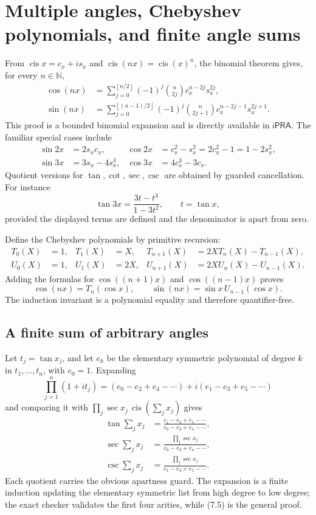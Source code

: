 \documentclass[11pt]{article}
\theoremstyle{definition}
\newcommand{\N}{\mathbb N}
\newcommand{\iPRA}{\mathsf{iPRA}}
\newcommand{\cis}{\operatorname{cis}}
\newcommand{\floor}[1]{\left\lfloor#1\right\rfloor}
\begin{document}
\section{Multiple angles, Chebyshev polynomials, and finite angle sums}
\label{sec:multiple}

From \(\cis x=c_x+is_x\) and \(\cis(nx)=\cis(x)^n\), the binomial theorem gives,
for every \(n\in\N\),
\begin{align}
 \cos(nx)
 &=\sum_{j=0}^{\floor{n/2}}(-1)^j\binom{n}{2j}
 c_x^{n-2j}s_x^{2j},\tag{7.1}\\
 \sin(nx)
 &=\sum_{j=0}^{\floor{(n-1)/2}}(-1)^j\binom{n}{2j+1}
 c_x^{n-2j-1}s_x^{2j+1}.\tag{7.2}
\end{align}
This proof is a bounded binomial expansion and is directly available in
\(\iPRA\).  The familiar special cases include
\begin{align*}
 \sin2x&=2s_xc_x,&
 \cos2x&=c_x^2-s_x^2=2c_x^2-1=1-2s_x^2,\\
 \sin3x&=3s_x-4s_x^3,&
 \cos3x&=4c_x^3-3c_x.
\end{align*}
Quotient versions for \(\tan,\cot,\sec,\csc\) are obtained by guarded
cancellation.  For instance
\[
 \tan3x=\frac{3t-t^3}{1-3t^2},\qquad t=\tan x,
 \tag{7.3}
\]
provided the displayed terms are defined and the denominator is apart from
zero.

Define the Chebyshev polynomials by primitive recursion:
\begin{align*}
 T_0(X)&=1,&T_1(X)&=X,&T_{n+1}(X)&=2XT_n(X)-T_{n-1}(X),\\
 U_0(X)&=1,&U_1(X)&=2X,&U_{n+1}(X)&=2XU_n(X)-U_{n-1}(X).
\end{align*}
Adding the formulas for \(\cos((n+1)x)\) and \(\cos((n-1)x)\) proves
\[
 \cos(nx)=T_n(\cos x),\qquad
 \sin(nx)=\sin x\,U_{n-1}(\cos x).
 \tag{7.4}
\]
The induction invariant is a polynomial equality and therefore quantifier-free.

\subsection{A finite sum of arbitrary angles}

Let \(t_j=\tan x_j\), and let \(e_k\) be the elementary symmetric polynomial
of degree \(k\) in \(t_1,\ldots,t_n\), with \(e_0=1\).  Expanding
\[
 \prod_{j=1}^n(1+it_j)
 =(e_0-e_2+e_4-\cdots)+i(e_1-e_3+e_5-\cdots)
 \tag{7.5}
\]
and comparing it with
\(\prod_j\sec x_j\,\cis(\sum_jx_j)\) gives
\begin{align}
 \tan\sum_jx_j&=
 \frac{e_1-e_3+e_5-\cdots}{e_0-e_2+e_4-\cdots},\tag{7.6}\\
 \sec\sum_jx_j&=
 \frac{\prod_j\sec x_j}{e_0-e_2+e_4-\cdots},\tag{7.7}\\
 \csc\sum_jx_j&=
 \frac{\prod_j\sec x_j}{e_1-e_3+e_5-\cdots}.
 \tag{7.8}
\end{align}
Each quotient carries the obvious apartness guard.  The expansion is a finite
induction updating the elementary symmetric list from high degree to low degree;
the exact checker validates the first four arities, while (7.5) is the general
proof.
\end{document}

